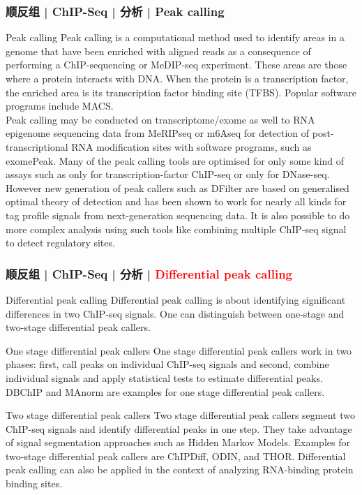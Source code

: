 \begin{frame}
  \frametitle{顺反组 | ChIP-Seq | 分析 | Peak calling}
  {\footnotesize
  \begin{block}{Peak calling}
    Peak calling is a computational method used to identify areas in a genome that have been enriched with aligned reads as a consequence of performing a ChIP-sequencing or MeDIP-seq experiment. These areas are those where a protein interacts with DNA. When the protein is a transcription factor, the enriched area is its transcription factor binding site (TFBS). Popular software programs include MACS.\\
    \vspace{1em}
    Peak calling may be conducted on transcriptome/exome as well to RNA epigenome sequencing data from MeRIPseq or m6Aseq for detection of post-transcriptional RNA modification sites with software programs, such as exomePeak. Many of the peak calling tools are optimised for only some kind of assays such as only for transcription-factor ChIP-seq or only for DNase-seq. However new generation of peak callers such as DFilter are based on generalised optimal theory of detection and has been shown to work for nearly all kinds for tag profile signals from next-generation sequencing data. It is also possible to do more complex analysis using such tools like combining multiple ChIP-seq signal to detect regulatory sites.
  \end{block}
  }
\end{frame}

\begin{frame}
  \frametitle{顺反组 | ChIP-Seq | 分析 | \textcolor{red}{Differential peak calling}}
  {\footnotesize
  \begin{block}{Differential peak calling}
  Differential peak calling is about identifying significant differences in two ChIP-seq signals. One can distinguish between one-stage and two-stage differential peak callers.
  \end{block}
  \pause
  \begin{block}{One stage differential peak callers}
    One stage differential peak callers work in two phases: first, call peaks on individual ChIP-seq signals and second, combine individual signals and apply statistical tests to estimate differential peaks. DBChIP and MAnorm are examples for one stage differential peak callers.
  \end{block}
  \pause
  \begin{block}{Two stage differential peak callers}
 Two stage differential peak callers segment two ChIP-seq signals and identify differential peaks in one step. They take advantage of signal segmentation approaches such as Hidden Markov Models. Examples for two-stage differential peak callers are ChIPDiff, ODIN, and THOR. Differential peak calling can also be applied in the context of analyzing RNA-binding protein binding sites. 
  \end{block}
  }
\end{frame}

